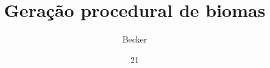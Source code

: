 \documentclass[tg]{mdtuffs}
\title{Geração procedural de biomas}
\author{Becker}{João Carlos}
\institute{Ciência da Computação}
\date{21}{Julho}{2017}
\begin{document}
\maketitle




\makeapprove





\end{document}
